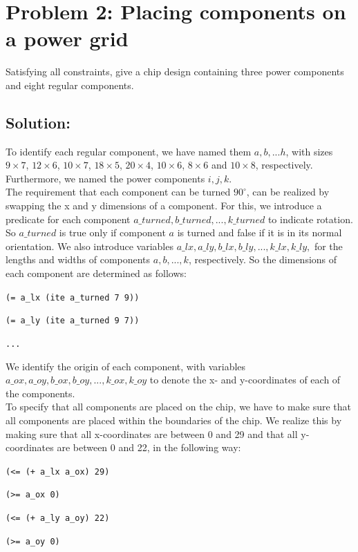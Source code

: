 \documentclass[a4paper]{article}
\begin{document}
	\section*{Problem 2: Placing components on a power grid}
	Satisfying all constraints, give a chip design containing three power components and eight regular components.

	\subsection*{Solution:}
	To identify each regular component, we have named them $a, b, ... h$, with sizes $9 \times 7$, $12 \times 6$, $10 \times 7$, $18 \times 5$, $20 \times 4$, $10 \times 6$, $8 \times 6$ and $10 \times 8$, respectively. Furthermore, we named the power components $i, j, k$.\\
	
	The requirement that each component can be turned $90^{\circ}$, can be realized by swapping the x and y dimensions of a component. For this, we introduce a predicate for each component $a\_turned, b\_turned, ..., k\_turned$ to indicate rotation. So $a\_turned$ is true only if component $a$ is turned and false if it is in its normal orientation. We also introduce variables $a\_lx, a\_ly, b\_lx, b\_ly, ..., k\_lx, k\_ly,$ for the lengths and widths of components $a, b, ..., k$, respectively. So the dimensions of each component are determined as follows:

	{\tt (= a\_lx (ite a\_turned 7 9))}
	
	{\tt (= a\_ly (ite a\_turned 9 7))}
	
	{\tt ...}
	
	\noindent We identify the origin of each component, with variables\\ $a\_ox, a\_oy, b\_ox, b\_oy, ..., k\_ox, k\_oy$ to denote the x- and y-coordinates of each of the components.\\
	
	To specify that all components are placed on the chip, we have to make sure that all components are placed within the boundaries of the chip. We realize this by making sure that all x-coordinates are between 0 and 29 and that all y-coordinates are between 0 and 22, in the following way:
	
	{\tt (<= (+ a\_lx a\_ox) 29)}
	
	{\tt (>= a\_ox 0)}
	
	{\tt (<= (+ a\_ly a\_oy) 22)}
	
	{\tt (>= a\_oy 0)}
	
\end{document}

